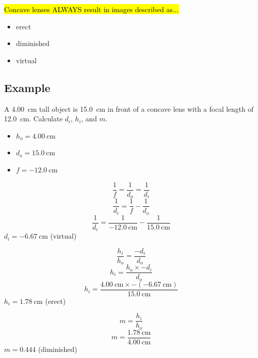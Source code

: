 \documentclass[a4paper,12pt]{article}
\begin{document}
\hl{Concave lenses ALWAYS result in images described as...}
\begin{itemize}
    \item{erect}
    \item{diminished}
    \item{virtual}
\end{itemize}

\subsection{Example}
A \SI{4.00}{\cm} tall object is \SI{15.0}{\cm} in front of a concave lens with a focal length of \SI{12.0}{\cm}. Calculate $d_i$, $h_i$, and $m$.
\begin{itemize}
    \item{$h_o = \SI{4.00}{\cm}$}
    \item{$d_o = \SI{15.0}{\cm}$}
    \item{$f = \SI{-12.0}{\cm}$}
\end{itemize}

$$\frac{1}{f} = \frac{1}{d_o} = \frac{1}{d_i}$$
$$\frac{1}{d_i} = \frac{1}{f} - \frac{1}{d_o}$$
$$\frac{1}{d_i} = \frac{1}{\SI{-12.0}{\cm}} - \frac{1}{\SI{15.0}{\cm}}$$
$d_i = \SI{-6.67}{\cm}$ (virtual)

$$\frac{h_i}{h_o} = \frac{-d_i}{d_o}$$
$$h_i = \frac{h_o \times -d_i}{d_o}$$
$$h_i = \frac{\SI{4.00}{\cm} \times -(\SI{-6.67}{\cm})}{\SI{15.0}{\cm}}$$
$h_i = \SI{1.78}{\cm}$ (erect)

$$m = \frac{h_i}{h_o}$$
$$m = \frac{\SI{1.78}{\cm}}{\SI{4.00}{\cm}}$$
$m = \num{0.444}$ (diminished)
\end{document}
